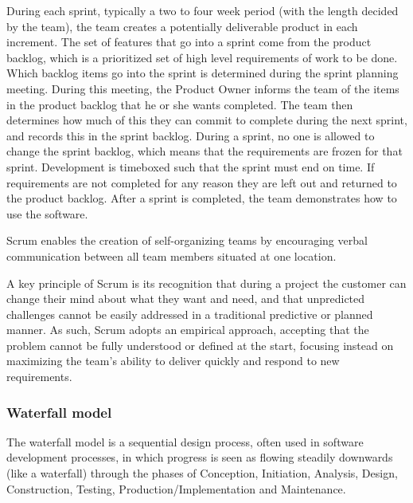 During each sprint, typically a two to four week period (with the length decided by the team),
the team creates a potentially deliverable product in each increment.
The set of features that go into a sprint come from the product backlog,
which is a prioritized set of high level requirements of work to be done.
Which backlog items go into the sprint is determined during the sprint planning meeting.
During this meeting, the Product Owner informs the team of the items in the product backlog that he
or she wants completed.
The team then determines how much of this they can commit to complete during the next sprint,
and records this in the sprint backlog.
During a sprint, no one is allowed to change the sprint backlog, which means that the requirements
are frozen for that sprint. Development is timeboxed such that the sprint must end on time.
If requirements are not completed for any reason they are left out and returned to the product backlog.
After a sprint is completed, the team demonstrates how to use the software.

Scrum enables the creation of self-organizing teams by encouraging verbal communication between all team members situated at one location.

A key principle of Scrum is its recognition that during a project the customer can change their
mind about what they want and need, and that unpredicted challenges cannot be easily addressed
in a traditional predictive or planned manner.
As such, Scrum adopts an empirical approach, accepting that the problem cannot be fully understood
or defined at the start, focusing instead on maximizing the team’s ability to deliver quickly and
respond to new requirements.

\subsubsection{Waterfall model}
The waterfall model is a sequential design process, often used in software development processes,
in which progress is seen as flowing steadily downwards (like a waterfall) through the phases of
Conception, Initiation, Analysis, Design, Construction, Testing, Production/Implementation and Maintenance.

